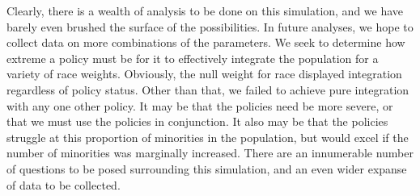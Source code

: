 Clearly, there is a wealth of analysis to be done on this simulation, and we have barely even brushed the surface of the 
possibilities. In future analyses, we hope to collect data on more combinations of the parameters. We seek to determine how 
extreme a policy must be for it to effectively integrate the population for a variety of race weights. Obviously, the null 
weight for race displayed integration regardless of policy status. Other than that, we failed to achieve pure integration 
with any one other policy. It may be that the policies need be more severe, or that we must use the policies in 
conjunction. It also may be that the policies struggle at this proportion of minorities in the population, but would 
excel if the number of minorities was marginally increased. There are an innumerable number of questions to be posed 
surrounding this simulation, and an even wider expanse of data to be collected.
